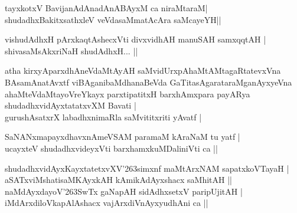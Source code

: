 \begin{entry}
\gl{}
\begin{shl}
tayxkotxV BavijanAdAnadAnABAyxM ca niraMtaraM|\\
shudadhxBakitxsathxleV veVdasaMmatAcAra saMcayeYH||
\end{shl}
\end{entry}

\begin{entry}
\begin{shl}
vishudAdhxH pArxkaqtAshecxVti divxvidhAH manuSAH samxqqtAH |\\
shivasaMsAkxriNaH shudAdhxH... ||
\end{shl}
\end{entry}

\begin{entry}
\end{entry}

\begin{entry}
\begin{shl}
atha kirxyAparxdhAneVdaMtAyAH saMvidUrxpAhaMtAMtagaRtatevxVna BAsamAnatAvxtf viBAganibaMdhanaBeVda GaTitasAgarataraMganAyxyeVna ahaMteVdaMtayoVreYkayx parxtipatitxH barxhAmxpara payARya shudadhxvidAyxtatatxvXM Bavati |\\ gurushAsatxrX labadhxnimaRla saMvititxriti yAvatf |
\end{shl}
\begin{shl}
SaNANxmapayxdhavxnAmeVSAM paramaM kAraNaM tu yatf |\\
ucayxteV shudadhxvideyxVti barxhamxkuMDaliniVti ca ||
\end{shl}
\begin{shl}
shudadhxvidAyxKayxtatetxvXV{\char'263}simxnf maMtArxNAM sapatxkoVTayaH |\\
aSATxviMshatisaMKAyxkAH kAmikAdAyxshacx saMhitAH ||\\
naMdAyxdayoV{\char'263}SwTx gaNapAH sidAdhxsetxV paripUjitAH |\\
iMdArxdiloVkapAlAshacx vajArxdiVnAyxyudhAni ca ||
\end{shl}
\end{entry}


